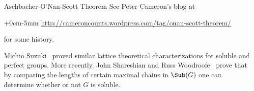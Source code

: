 \begin{frame}[fragile,label=OSTheorem]{Aschbacher-O'Nan-Scott Theorem}
See Peter Cameron's blog at 
\vskip5mm
\begin{changemargin}{+0cm}{-5mm}
{\small  \url{http://cameroncounts.wordpress.com/tag/onan-scott-theorem/}}
\end{changemargin}
\vskip5mm
 for some history.
\end{frame}














Michio Suzuki~\cite{Suzuki:1951} proved similar lattice theoretical
characterizations for soluble and perfect groups. 
More recently, 
John Shareshian and Russ Woodroofe~\cite{Shareshian:2012} prove that by comparing the lengths of certain maximal
chains in $\Sub(G)$ one can determine whether or not $G$ is soluble.



















